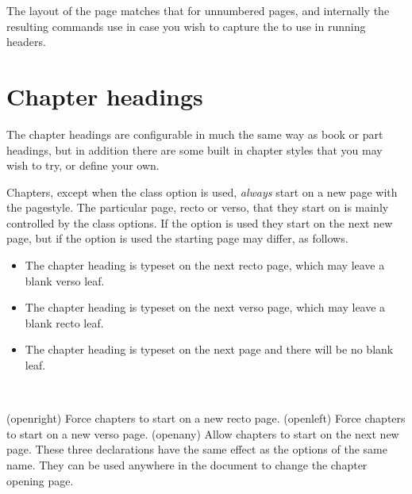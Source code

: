     The layout of the page matches that for unnumbered \cmd{\part} pages, and
internally the resulting commands use \cmd{\partmark} in case you
wish to capture the  to use in running headers.



\section{Chapter headings}
\label{sec:chapter-headings}

    The chapter headings are configurable in much the same way as book or part
headings, but in addition there are some built in chapter styles that you may
wish to try, or define your own.

    Chapters, except when the  class option is used,
 \emph{always} start on a new page with the 
pagestyle. The particular page, recto or verso, that they start on is
mainly controlled by the class options. If the  option is used
they start on the next new page, but if the  option is
used the starting page may differ, as follows.
\begin{itemize}
\item[\Lopt{openright}] The chapter heading is typeset on the next recto page,
  which may leave a blank verso leaf.
\item[\Lopt{openleft}] The chapter heading is typeset on the next verso page,
  which may leave a blank recto leaf.
\item[\Lopt{openany}] The chapter heading is typeset on the next page and there
  will be no blank leaf.
\end{itemize}

\begin{syntax}
\cmd{\openright} \cmd{\openleft} \cmd{\openany} \\
\end{syntax}
\glossary(openright)%
  {}%
  {Force chapters to start on a new recto page.}
\glossary(openleft)%
  {}%
  {Force chapters to start on a new verso page.}
\glossary(openany)%
  {}%
  {Allow chapters to start on the next new page.}
These three declarations have the same effect as the options of the same name.
They can be used anywhere in the document to change the chapter opening page.

